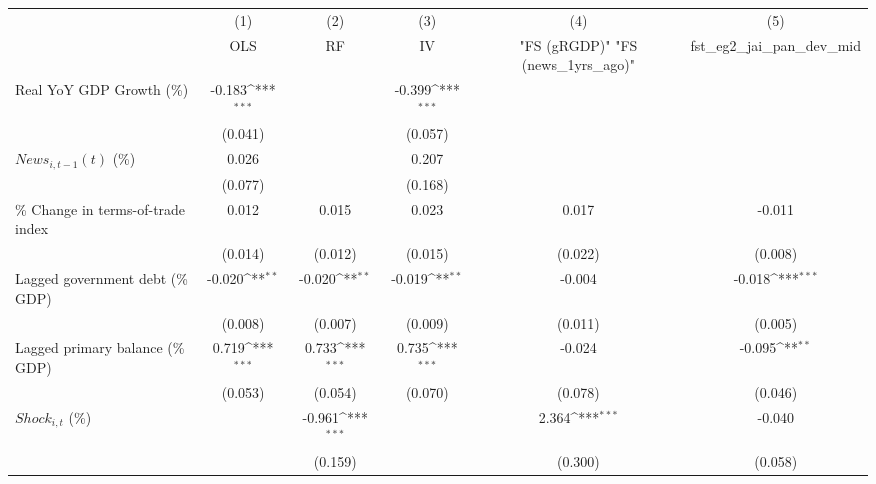 {
\def\sym#1{\ifmmode^{#1}\else\(^{#1}\)\fi}
\begin{tabular}{l*{5}{c}}
\toprule
                    &\multicolumn{1}{c}{(1)}&\multicolumn{1}{c}{(2)}&\multicolumn{1}{c}{(3)}&\multicolumn{1}{c}{(4)}&\multicolumn{1}{c}{(5)}\\
                    &\multicolumn{1}{c}{OLS}&\multicolumn{1}{c}{RF}&\multicolumn{1}{c}{IV}&\multicolumn{1}{c}{ "FS (gRGDP)"  "FS (news_1yrs_ago)" }&\multicolumn{1}{c}{fst_eg2_jai_pan_dev_mid}\\
\midrule
Real YoY GDP Growth (\%)&      -0.183\sym{***}&                     &      -0.399\sym{***}&                     &                     \\
                    &     (0.041)         &                     &     (0.057)         &                     &                     \\
\addlinespace
$ News_{i,t-1}(t)$ (\%)&       0.026         &                     &       0.207         &                     &                     \\
                    &     (0.077)         &                     &     (0.168)         &                     &                     \\
\addlinespace
\% Change in terms-of-trade index&       0.012         &       0.015         &       0.023         &       0.017         &      -0.011         \\
                    &     (0.014)         &     (0.012)         &     (0.015)         &     (0.022)         &     (0.008)         \\
\addlinespace
Lagged government debt (\% GDP)&      -0.020\sym{**} &      -0.020\sym{**} &      -0.019\sym{**} &      -0.004         &      -0.018\sym{***}\\
                    &     (0.008)         &     (0.007)         &     (0.009)         &     (0.011)         &     (0.005)         \\
\addlinespace
Lagged primary balance (\% GDP)&       0.719\sym{***}&       0.733\sym{***}&       0.735\sym{***}&      -0.024         &      -0.095\sym{**} \\
                    &     (0.053)         &     (0.054)         &     (0.070)         &     (0.078)         &     (0.046)         \\
\addlinespace
$ Shock_{i,t}$ (\%) &                     &      -0.961\sym{***}&                     &       2.364\sym{***}&      -0.040         \\
                    &                     &     (0.159)         &                     &     (0.300)         &     (0.058)         \\

\end{tabular}}
